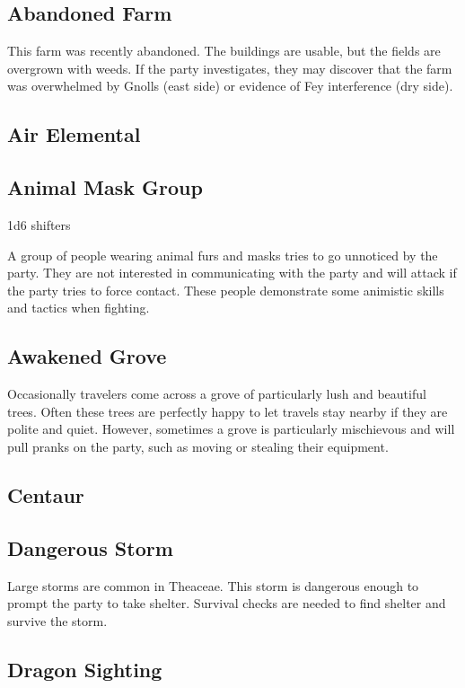 \subsection{Abandoned Farm}

This farm was recently abandoned.
The buildings are usable, but the fields are overgrown with weeds.
If the party investigates, they may discover that the farm was overwhelmed by Gnolls (east side) or evidence of Fey interference (dry side).

\subsection{Air Elemental}

\subsection{Animal Mask Group}

1d6 shifters

A group of people wearing animal furs and masks tries to go unnoticed by the party.
They are not interested in communicating with the party and will attack if the party tries to force contact.
These people demonstrate some animistic skills and tactics when fighting.

\subsection{Awakened Grove}

Occasionally travelers come across a grove of particularly lush and beautiful trees.
Often these trees are perfectly happy to let travels stay nearby if they are polite and quiet.
However, sometimes a grove is particularly mischievous and will pull pranks on the party, such as moving or stealing their equipment.

\subsection{Centaur}

\subsection{Dangerous Storm}

Large storms are common in Theaceae.
This storm is dangerous enough to prompt the party to take shelter.
Survival checks are needed to find shelter and survive the storm.

\subsection{Dragon Sighting}

